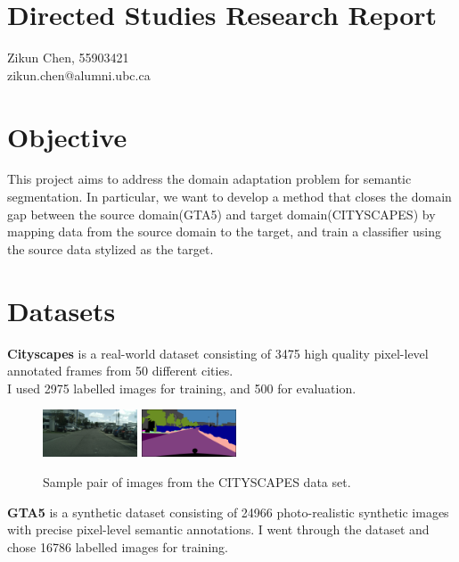 \documentclass{article}
\begin{document}
\section*{Directed Studies Research Report}
Zikun Chen, 55903421\\
zikun.chen@alumni.ubc.ca
\section{Objective}
This project aims to address the domain adaptation problem for semantic segmentation. In particular, we want to develop a method that closes the domain gap between the source domain(GTA5) and target domain(CITYSCAPES) by mapping data from the source domain to the target, and train a classifier using the source data stylized as the target.
\section{Datasets}
\textbf{Cityscapes} \cite{cordts2016cityscapes} is a real-world dataset consisting of 3475 high quality pixel-level annotated frames from 50 different cities.\\ I used 2975 labelled images for training, and 500 for evaluation.\\
\begin{figure}[H]
    \centering
    \includegraphics[width=0.25\textwidth]{figures/ulm_000088_000019_leftImg8bit.jpg}
    \includegraphics[width=0.25\textwidth]{figures/ulm_000088_000019_gtFine_color.png}
    \caption{Sample pair of images from the CITYSCAPES data set.}
    \label{fig:cityscapes}
\end{figure}
\textbf{GTA5} \cite{richter2016playing} is a synthetic dataset consisting of 24966 photo-realistic synthetic images with precise pixel-level semantic annotations. I went through the dataset and chose 16786 labelled images for training.
\end{document}
